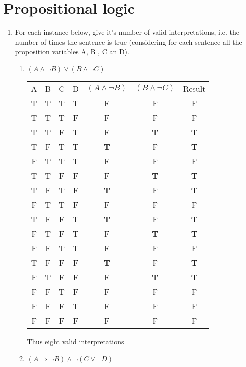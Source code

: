 \section{Propositional logic}
\begin{enumerate}
    \item For each instance below, give it's number of valid interpretations, i.e. the number of times the sentence is true (considering for each sentence all the proposition variables A, B , C an D).
    	\begin{enumerate}
    		\item $(A \wedge \lnot B) \vee (B \wedge \lnot C)$
    			\begin{framed}
    				\begin{tabular}{c|c|c|c|c|c|c}
    					A	&B	&C	&D	&$(A \wedge \lnot B)$	&$(B \wedge \lnot C)$ &Result\\
    					T	&T	&T	&T	&F			&F			&F\\
    					T	&T	&T	&F	&F			&F			&F\\
    					T	&T	&F	&T	&F			&\textbf{T}	&\textbf{T}\\
    					T	&F	&T	&T	&\textbf{T}	&F			&\textbf{T}\\
    					F	&T	&T	&T	&F			&F			&F\\
    					T	&T	&F	&F	&F			&\textbf{T}	&\textbf{T}\\
    					T	&F	&T	&F	&\textbf{T}	&F			&\textbf{T}\\
    					F	&T	&T	&F	&F			&F			&F\\
    					T	&F	&F	&T	&\textbf{T}	&F			&\textbf{T}\\
    					F	&T	&F	&T	&F			&\textbf{T}	&\textbf{T}\\
    					F	&F	&T	&T	&F			&F			&F\\
    					T	&F	&F	&F	&\textbf{T}	&F			&\textbf{T}\\
    					F	&T	&F	&F	&F			&\textbf{T}	&\textbf{T}\\
    					F	&F	&T	&F	&F			&F			&F\\
    					F	&F	&F	&T	&F			&F			&F\\
    					F	&F	&F	&F	&F			&F			&F\\
    				\end{tabular}
    				\FloatBarrier
    				\vspace{5mm}
    				Thus eight valid interpretations
    			\end{framed}
    		\item $(A \Rightarrow \lnot B) \wedge \lnot(C \vee \lnot D)$
    			\begin{framed}

\end{framed}
\end{enumerate}
\end{enumerate}
